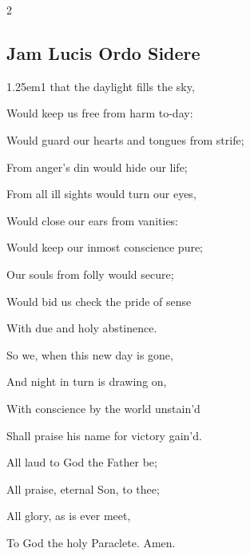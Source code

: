 \begin{multicols}{2}
\subsection{Jam Lucis Ordo Sidere}
\begin{hangparas}{1.25em}{1}
 that the daylight fills the sky,\par
{}\par\noindent
{}\par\noindent
Would keep us free from harm to-day:\\
\par\noindent
Would guard our hearts and tongues from strife;\par\noindent
From anger's din would hide our life;\par\noindent
From all ill sights would turn our eyes,\par\noindent
Would close our ears from vanities:\\
\par\noindent
Would keep our inmost conscience pure;\par\noindent
Our souls from folly would secure;\par\noindent
Would bid us check the pride of sense\par\noindent
With due and holy abstinence.\\
\par\noindent
So we, when this new day is gone,\par\noindent
And night in turn is drawing on,\par\noindent
With conscience by the world unstain'd\par\noindent
Shall praise his name for victory gain'd.%
\par\noindent
All laud to God the Father be;\par\noindent
All praise, eternal Son, to thee;\par\noindent
All glory, as is ever meet,\par\noindent
To God the holy Paraclete. Amen.\\
\end{hangparas}


\end{multicols}
